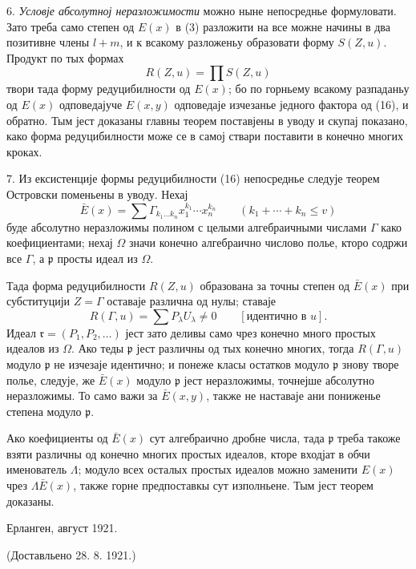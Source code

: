 ﻿\documentclass[11pt]{article}
\begin{document}
6. \emph{Условје абсолутној неразложимости} можно ныне непосреднье формуловати. Зато треба само степен од $E(x)$ в (3) разложити на все можне начины в два позитивне члены $l+m$, и к всакому разложеньу образовати форму $S(Z,u)$. Продукт по тых формах
\begin{equation}
 R(Z,u)=\prod S(Z,u)
\tag{16}
\end{equation}
твори тада форму редуцибилности од $E(x)$; бо по горньему всакому разпаданьу од $E(x)$ одповедајуче $E(x,y)$ одповедаје изчезанье једного фактора од (16), и обратно. Тым јест доказаны главны теорем поставјены в уводу и скупај показано, како форма редуцибилности може се в самој ствари поставити в конечно многих кроках.

7. Из ексистенције формы редуцибилности (16) непосреднье следује теорем Островски поменьены в уводу. Нехај
\[
 \bar E(x)=\sum \Gamma_{k_1\ldots k_n}x_1^{k_1}\cdots x_n^{k_n}
 \qquad(k_1+\cdots+k_n\le v)
\]
буде абсолутно неразложимы полином с целыми алгебраичными числами $\Gamma$ како коефициентами; нехај $\Omega$ значи конечно алгебраично числово полье, кторо содржи все $\Gamma$, а $\mathfrak p$ просты идеал из $\Omega$.

Тада форма редуцибилности $R(Z,u)$ образована за точны степен од $\bar E(x)$ при субституцији $Z=\Gamma$ оставаје различна од нулы; ставаје
\[
 R(\Gamma,u)=\sum P_\lambda U_\lambda\ne0\qquad[\text{идентично в }u].
\]
Идеал $\mathfrak r=(P_1,P_2,\ldots)$ јест зато деливы само чрез конечно много простых идеалов из $\Omega$. Ако теды $\mathfrak p$ јест различны од тых конечно многих, тогда $R(\Gamma,u)$ модуло $\mathfrak p$ не изчезаје идентично; и понеже класы остатков модуло $\mathfrak p$ знову творе полье, следује, же $\bar E(x)$ модуло $\mathfrak p$ јест неразложимы, точнејше абсолутно неразложимы. То само важи за $\bar E(x,y)$, также не наставаје ани пониженье степена модуло $\mathfrak p$.

Ако коефициенты од $\bar E(x)$ сут алгебраично дробне числа, тада $\mathfrak p$ треба такоже взяти различны од конечно многих простых идеалов, кторе входјат в обчи именователь $\Lambda$; модуло всех осталых простых идеалов можно заменити $E(x)$ чрез $\Lambda\bar E(x)$, также горне предпоставкы сут изполньене. Тым јест теорем доказаны.

\begin{flushleft}
Ерланген, август 1921.
\end{flushleft}
\begin{center}
(Доставльено 28. 8. 1921.)
\end{center}

\clearpage
\end{document}
